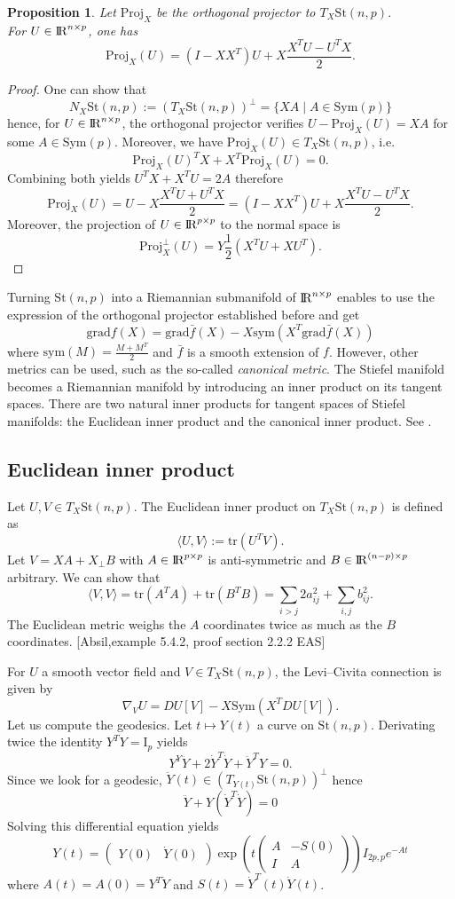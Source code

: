 \documentclass[10pt,a4paper]{book}
\theoremstyle{definition}
\theoremstyle{plain}
\newtheorem{prop}{Proposition}[section]
\theoremstyle{remark}
\newcommand{\grad}{\textrm{grad}}
\newcommand \Stif {\textrm{St}}
\def\R{{\rm I\kern-0.16em R}}
\begin{document}
\begin{prop} Let $\text{Proj}_X$ be the orthogonal projector to $T_X\Stif(n,p)$. \\For $U \in \R^{n\times p}$, one has
$$\text{Proj}_X(U)=(I-XX^{T})U+X\frac{X^TU-U^TX}{2}.$$
\end{prop} 
\begin{proof}
One can show that
$$N_X\Stif(n,p):=(T_X\Stif(n,p))^{\bot}=\{XA \mid A \in \text{Sym}(p)\}$$
hence, for $U\in \R^{n\times p}$, the orthogonal projector verifies
$U-\text{Proj}_X(U)=XA$ for some $A\in \text{Sym}(p)$. Moreover, we have $\text{Proj}_X(U)\in T_X\Stif(n,p)$, i.e.
$$\text{Proj}_X(U)^{T}X+X^{T}\text{Proj}_X(U)=0.$$
Combining both yields $U^{T}X+X^{T}U=2A$ therefore
$$\text{Proj}_X(U)=U-X\frac{X^TU+U^TX}{2}=(I-XX^{T})U+X\frac{X^TU-U^TX}{2}.$$
Moreover, the projection of $U\in \R^{p\times p}$ to the normal space is
$$\text{Proj}_{X}^{\bot}(U)=Y\frac{1}{2}(X^TU+XU^T).$$
\end{proof}
Turning $\Stif(n,p)$ into a Riemannian submanifold of $\R^{n\times p}$ enables to use the expression of the orthogonal projector established before and get
$$\grad f(X)=\grad \bar{f}(X)-X\text{sym}(X^{T}\grad \bar{f}(X))$$
where $\text{sym}(M)=\frac{M+M^{T}}{2}$ and $\bar{f}$ is a smooth extension of $f$. However, other metrics can be used, such as the so-called \emph{canonical metric}.
The Stiefel manifold becomes a Riemannian manifold by introducing an inner product on its tangent spaces. There are two natural inner products for tangent spaces of Stiefel manifolds: the Euclidean inner product and the canonical inner product.
See \cite{edelman1998geometry}.
\subsection{Euclidean inner product}
Let $U,V\in T_X\Stif(n,p)$. The Euclidean inner product on $T_X\Stif(n,p)$ is defined as
$$\langle U,V\rangle:=\text{tr}(U^{T}V).$$
Let $V=XA+X_{\bot}B$ with $A\in \R^{p\times p}$ is anti-symmetric and $B\in \R^{(n-p)\times p}$ arbitrary. We can show that
$$\langle V,V\rangle=\text{tr}(A^{T}A)+\text{tr}(B^TB)=\sum_{i>j}2a^{2}_{ij}+\sum_{i,j}b^{2}_{ij}.$$The Euclidean metric weighs the $A$ coordinates twice as much as the $B$ coordinates.
[Absil,example 5.4.2, proof section 2.2.2 EAS]

For $U$ a smooth vector field and $V\in T_X\Stif(n,p)$, the Levi--Civita connection is given by
$$\nabla_VU=DU[V]-X\text{Sym}(X^{T}DU[V]).$$
Let us compute the geodesics. Let $t\mapsto Y(t)$ a curve on $\Stif(n,p)$. Derivating twice the identity $Y^TY=\text{I}_p$ yields
$$Y^{Y}\ddot{Y} +2\dot{Y}^T\dot{Y}+\ddot{Y}^TY=0.$$
Since we look for a geodesic, $\ddot{Y}(t) \in (T_{Y(t)}\Stif(n,p))^{\bot}$ hence
$$\ddot{Y}+Y(\dot{Y}^T\dot{Y})=0$$ Solving this differential equation yields
$$Y(t)=\left(\begin{array}{cc}Y(0) & \dot{Y}(0)\end{array}\right) \exp \left(t\left(\begin{array}{cc}A & -S(0)\\I & A\end{array}\right) \right) I_{2p,p}e^{-At}$$
where $A(t)=A(0)=Y^T\dot{Y}$ and $S(t)=\dot{Y}^{T}(t)\dot{Y}(t)$. 
\end{document}
